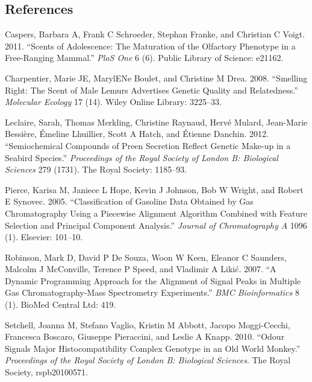\documentclass[]{article}
\begin{document}
\subsection*{References}\label{references}

\hypertarget{refs}{}
\hypertarget{ref-caspers2011scents}{}
Caspers, Barbara A, Frank C Schroeder, Stephan Franke, and Christian C
Voigt. 2011. ``Scents of Adolescence: The Maturation of the Olfactory
Phenotype in a Free-Ranging Mammal.'' \emph{PloS One} 6 (6). Public
Library of Science: e21162.

\hypertarget{ref-charpentier2008smelling}{}
Charpentier, Marie JE, MarylENe Boulet, and Christine M Drea. 2008.
``Smelling Right: The Scent of Male Lemurs Advertises Genetic Quality
and Relatedness.'' \emph{Molecular Ecology} 17 (14). Wiley Online
Library: 3225--33.

\hypertarget{ref-leclaire2012semiochemical}{}
Leclaire, Sarah, Thomas Merkling, Christine Raynaud, Hervé Mulard,
Jean-Marie Bessière, Émeline Lhuillier, Scott A Hatch, and Étienne
Danchin. 2012. ``Semiochemical Compounds of Preen Secretion Reflect
Genetic Make-up in a Seabird Species.'' \emph{Proceedings of the Royal
Society of London B: Biological Sciences} 279 (1731). The Royal Society:
1185--93.

\hypertarget{ref-pierce2005classification}{}
Pierce, Karisa M, Janiece L Hope, Kevin J Johnson, Bob W Wright, and
Robert E Synovec. 2005. ``Classification of Gasoline Data Obtained by
Gas Chromatography Using a Piecewise Alignment Algorithm Combined with
Feature Selection and Principal Component Analysis.'' \emph{Journal of
Chromatography A} 1096 (1). Elsevier: 101--10.

\hypertarget{ref-robinson2007dynamic}{}
Robinson, Mark D, David P De Souza, Woon W Keen, Eleanor C Saunders,
Malcolm J McConville, Terence P Speed, and Vladimir A Likić. 2007. ``A
Dynamic Programming Approach for the Alignment of Signal Peaks in
Multiple Gas Chromatography-Mass Spectrometry Experiments.'' \emph{BMC
Bioinformatics} 8 (1). BioMed Central Ltd: 419.

\hypertarget{ref-setchell2010odour}{}
Setchell, Joanna M, Stefano Vaglio, Kristin M Abbott, Jacopo
Moggi-Cecchi, Francesca Boscaro, Giuseppe Pieraccini, and Leslie A
Knapp. 2010. ``Odour Signals Major Histocompatibility Complex Genotype
in an Old World Monkey.'' \emph{Proceedings of the Royal Society of
London B: Biological Sciences}. The Royal Society, rspb20100571.
\end{document}

